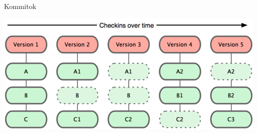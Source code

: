 
\begin{frame}{Kommitok}
    \begin{center}
        \includegraphics{frames/diagrams/commits.png}
    \end{center}
\end{frame}

